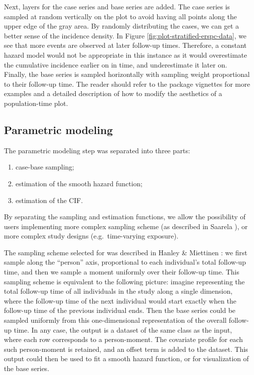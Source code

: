 \documentclass[
]{jss}
\providecommand{\tightlist}{%
  \setlength{\itemsep}{0pt}\setlength{\parskip}{0pt}}
\begin{document}
Next, layers for the case series and base series are added. The case
series is sampled at random vertically on the plot to avoid having all
points along the upper edge of the gray area. By randomly distributing
the cases, we can get a better sense of the incidence density. In Figure
\ref{fig:plot-stratified-erspc-data}, we see that more events are
observed at later follow-up times. Therefore, a constant hazard model
would not be appropriate in this instance as it would overestimate the
cumulative incidence earlier on in time, and underestimate it later on.
Finally, the base series is sampled horizontally with sampling weight
proportional to their follow-up time. The reader should refer to the
package vignettes for more examples and a detailed description of how to
modify the aesthetics of a population-time plot.

\hypertarget{parametric-modeling}{%
\subsection{Parametric modeling}\label{parametric-modeling}}

The parametric modeling step was separated into three parts:

\begin{enumerate}
\def\labelenumi{\arabic{enumi}.}
\tightlist
\item
  case-base sampling;
\item
  estimation of the smooth hazard function;
\item
  estimation of the CIF.
\end{enumerate}

By separating the sampling and estimation functions, we allow the
possibility of users implementing more complex sampling scheme (as
described in Saarela \citeyearpar{saarela2016case}), or more complex
study designs (e.g.~time-varying exposure).

The sampling scheme selected for  was described in
Hanley \& Miettinen \citeyearpar{hanley2009fitting}: we first sample
along the ``person'' axis, proportional to each individual's total
follow-up time, and then we sample a moment uniformly over their
follow-up time. This sampling scheme is equivalent to the following
picture: imagine representing the total follow-up time of all
individuals in the study along a single dimension, where the follow-up
time of the next individual would start exactly when the follow-up time
of the previous individual ends. Then the base series could be sampled
uniformly from this one-dimensional representation of the overall
follow-up time. In any case, the output is a dataset of the same class
as the input, where each row corresponds to a person-moment. The
covariate profile for each such person-moment is retained, and an offset
term is added to the dataset. This output could then be used to fit a
smooth hazard function, or for visualization of the base series.
\end{document}

